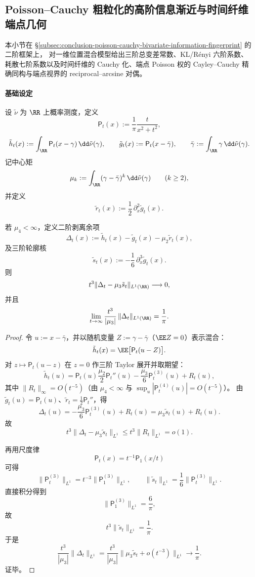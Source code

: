 \subsection{Poisson--Cauchy 粗粒化的高阶信息渐近与时间纤维端点几何}\label{subsec:conclusion-poisson-cauchy-high-order-entropy-fiber-rigidity}
本小节在 \S\ref{subsec:conclusion-poisson-cauchy-bivariate-information-fingerprint} 的二阶框架上，
对一维位置混合模型给出三阶总变差常数、KL/R\'enyi 六阶系数、耗散七阶系数以及时间纤维的 Cauchy 化、端点 Poisson 权的 Cayley--Cauchy 精确同构与端点视界的 reciprocal--arcsine 对偶。

\paragraph{基础设定}
设 \(\tilde\nu\) 为 \(\RR\) 上概率测度，定义
\[
\mathsf P_t(x):=\frac1\pi\frac{t}{x^2+t^2},
\]
\[
\tilde h_t(x):=\int_{\RR}\mathsf P_t(x-\gamma)\,\dd\tilde\nu(\gamma),\qquad
\tilde g_t(x):=\mathsf P_t(x-\bar\gamma),\qquad
\bar\gamma:=\int_{\RR}\gamma\,\dd\tilde\nu(\gamma).
\]
记中心矩
\[
\mu_k:=\int_{\RR}(\gamma-\bar\gamma)^k\,\dd\tilde\nu(\gamma)\qquad(k\ge 2),
\]
并定义
\[
\tilde r_t(x):=\frac12\,\partial_x^2\tilde g_t(x).
\]

\begin{theorem}[三阶去方差总变差常数]\label{thm:conclusion-poisson-cauchy-third-order-tv-constant}
若 \(\mu_4<\infty\)，定义二阶剥离余项
\[
\Delta_t(x):=\tilde h_t(x)-\tilde g_t(x)-\mu_2\tilde r_t(x),
\]
及三阶轮廓核
\[
\tilde s_t(x):=-\frac16\,\partial_x^3\tilde g_t(x).
\]
则
\[
t^3\|\Delta_t-\mu_3\tilde s_t\|_{L^1(\RR)}\longrightarrow 0,
\]
并且
\[
\lim_{t\to\infty}\frac{t^3}{|\mu_3|}\,\|\Delta_t\|_{L^1(\RR)}=\frac1\pi.
\]
\end{theorem}
\begin{proof}
令 \(u:=x-\bar\gamma\)，并以随机变量 \(Z:=\gamma-\bar\gamma\)（\(\EE Z=0\)）表示混合：
\[
\tilde h_t(x)=\EE\bigl[\mathsf P_t(u-Z)\bigr].
\]
对 \(z\mapsto \mathsf P_t(u-z)\) 在 \(z=0\) 作三阶 Taylor 展开并取期望：
\[
\tilde h_t(u)
=
\mathsf P_t(u)
\frac{\mu_2}{2}\mathsf P_t''(u)
-\frac{\mu_3}{6}\mathsf P_t^{(3)}(u)
+R_t(u),
\]
其中 \(\|R_t\|_\infty=O(t^{-5})\)（由 \(\mu_4<\infty\) 与 \(\sup_u|\mathsf P_t^{(4)}(u)|=O(t^{-5})\)）。
由 \(\tilde g_t(u)=\mathsf P_t(u)\)、\(\tilde r_t=\frac12\mathsf P_t''\)，得
\[
\Delta_t(u)= -\frac{\mu_3}{6}\mathsf P_t^{(3)}(u)+R_t(u)=\mu_3\tilde s_t(u)+R_t(u).
\]
故
\[
t^3\|\Delta_t-\mu_3\tilde s_t\|_{L^1}\le t^3\|R_t\|_{L^1}=o(1).
\]

再用尺度律
\[
\mathsf P_t(x)=t^{-1}\mathsf P_1(x/t)
\]
可得
\[
\|\mathsf P_t^{(3)}\|_{L^1}=t^{-3}\|\mathsf P_1^{(3)}\|_{L^1},
\qquad
\|\tilde s_t\|_{L^1}=\frac16\|\mathsf P_t^{(3)}\|_{L^1}.
\]
直接积分得到
\[
\|\mathsf P_1^{(3)}\|_{L^1}=\frac6\pi,
\]
故
\[
t^3\|\tilde s_t\|_{L^1}=\frac1\pi.
\]
于是
\[
\frac{t^3}{|\mu_3|}\|\Delta_t\|_{L^1}
=
\frac{t^3}{|\mu_3|}\|\mu_3\tilde s_t+o(t^{-3})\|_{L^1}
\longrightarrow
\frac1\pi.
\]
证毕。
\end{proof}

